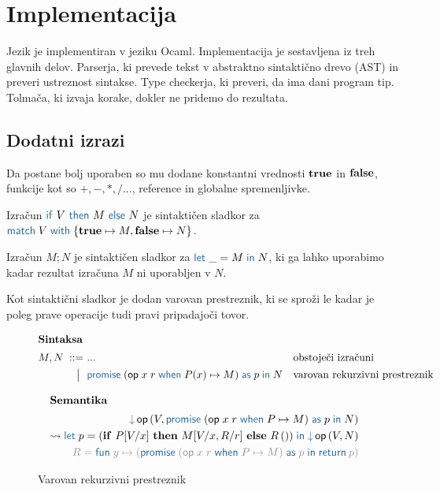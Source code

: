 \section{Implementacija}\label{sec:impl}

Jezik \aeff{} je implementiran v jeziku Ocaml. Implementacija je sestavljena iz treh glavnih delov.
Parserja, ki prevede tekst v abstraktno sintaktično drevo (AST) in preveri ustreznost sintakse.  
Type checkerja, ki preveri, da ima dani program tip.
Tolmača, ki izvaja korake, dokler ne pridemo do rezultata.

\subsection{Dodatni izrazi}

Da \aeff{} postane bolj uporaben so mu dodane konstantni vrednosti $\mathbf{true}$ in $\mathbf{false}$, funkcije kot so $+, -, *, / ...$, reference in globalne spremenljivke.

Izračun $\tmkw{if}\ V\ \tmkw{then}\ M\ \tmkw{else}\ N$ je sintaktičen sladkor za $\tmmatch{V}{\true \mapsto M, \false \mapsto N}$.

Izračun $M;N$ je sintaktičen sladkor za $\tmlet{\_}{M}{N}$, ki ga lahko uporabimo kadar rezultat izračuna $M$ ni uporabljen v $N$.

Kot sintaktični sladkor je dodan varovan prestreznik, ki se sproži le kadar je poleg prave operacije tudi pravi pripadajoči tovor.
\begin{figure}[h]
	\centering
	\small
	\begin{align*}
	\intertext{\textbf{Sintaksa}}
	M, N
	\bnfis& ...                            & &\text{obstoječi izračuni} \\
	\bnfor& \tmwithrecgu{op}{x}{r}{P(x)}{M}{p}{N}  & &\text{varovan rekurzivni prestreznik}
	\end{align*}
	
	\begin{align*}
	\intertext{\textbf{Semantika}}
	\tmopin{op}{V}{\tmwithrecgu{op}{x}{r}{P}{M}{p}{N}} \\ \reduces \tmlet{p}{(\ite{P[V/x]}{M[V/x, R/r]}{R\,()})}{\tmopin{op}{V}{N}} \\
	{\color{rulenameColor}R = \tmfunano{y}{(\tmwithrecgu{op}{x}{r}{P}{M}{p}{\tmreturn{p}})}}
	\end{align*}
	
	\caption{Varovan rekurzivni prestreznik}
	\label{fig:izrazi-varovan-prestreznik}
\end{figure}


